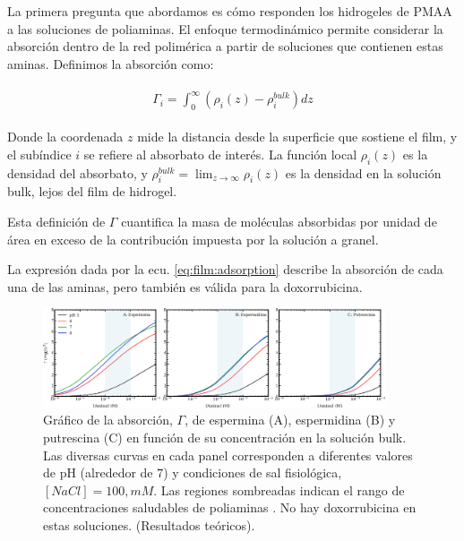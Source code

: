 La primera pregunta que abordamos es c\'omo responden los hidrogeles de PMAA a las soluciones de poliaminas. El enfoque termodin\'amico permite considerar la absorci\'on dentro de la red polim\'erica a partir de soluciones que contienen estas aminas. Definimos la absorci\'on como:

\begin{align}
	\begin{aligned}
		\Gamma_i= \int_0^\infty{(\rho_i(z) -\rho_i^{bulk})dz}
	\end{aligned}
	\label{eq:film:adsorption}
\end{align}


\noindent Donde la coordenada $z$ mide la distancia desde la superficie que sostiene el film, y el sub\'indice $i$ se refiere al absorbato de inter\'es. 
La funci\'on local $\rho_i(z)$ es la densidad del absorbato, y $\rho_i^{bulk}=\lim_{z\to\infty} \rho_i(z)$ es la densidad en la soluci\'on bulk, lejos del film  de hidrogel. 

Esta definici\'on de $\Gamma$ cuantifica la masa de mol\'eculas absorbidas por unidad de \'area en exceso de la contribuci\'on impuesta por la soluci\'on a granel. 

La expresi\'on dada por la ecu. \ref{eq:film:adsorption} describe la absorci\'on de cada una de las aminas, pero tambi\'en es v\'alida para la doxorrubicina.


\begin{figure}[!htb]
	\centering
	\includegraphics[width=0.9\textwidth]{Figures/graph-film/amines_ads.pdf}
	\caption{Gr\'afico de la absorción, $\Gamma$, de espermina (A), espermidina (B) y putrescina (C) en funci\'on de su concentraci\'on en la soluci\'on bulk.
		Las diversas curvas en cada panel corresponden a diferentes valores de pH (alrededor de $7$) y condiciones de sal fisiol\'ogica, $[NaCl]=100 ,mM$. Las regiones sombreadas indican el rango de concentraciones saludables de poliaminas \cite{Soda2011}.
		No hay doxorrubicina en estas soluciones. (Resultados te\'oricos).}
	\label{fig:film:amines-ads}
\end{figure}




